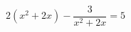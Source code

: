 \begin{ex}[type=equation]
	\begin{condition}
		$2\left(x^2 + 2x \right) -\dfrac{3}{x^2 + 2x} = 5$
	\end{condition}
\end{ex}
